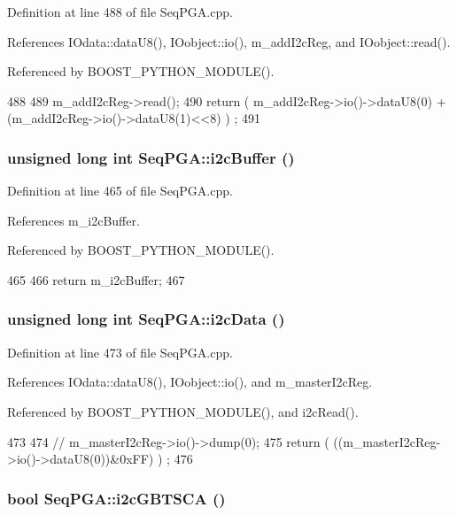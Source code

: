Definition at line 488 of file SeqPGA.cpp.

References IOdata::dataU8(), IOobject::io(), m\_\-addI2cReg, and IOobject::read().

Referenced by BOOST\_\-PYTHON\_\-MODULE().


\begin{DoxyCode}
488                                 {
489   m_addI2cReg->read();
490   return ( m_addI2cReg->io()->dataU8(0) + (m_addI2cReg->io()->dataU8(1)<<8) ) ;
491 }
\end{DoxyCode}
\hypertarget{classSeqPGA_a3d441522bfe5a6d35b8a77cbcd38b49e}{
\subsubsection[{i2cBuffer}]{\setlength{\rightskip}{0pt plus 5cm}unsigned long int SeqPGA::i2cBuffer ()}}
\label{classSeqPGA_a3d441522bfe5a6d35b8a77cbcd38b49e}


Definition at line 465 of file SeqPGA.cpp.

References m\_\-i2cBuffer.

Referenced by BOOST\_\-PYTHON\_\-MODULE().


\begin{DoxyCode}
465                                    {
466   return m_i2cBuffer;
467 }
\end{DoxyCode}
\hypertarget{classSeqPGA_a5e48f7b7ca1ada5a1decc0436dda4b26}{
\subsubsection[{i2cData}]{\setlength{\rightskip}{0pt plus 5cm}unsigned long int SeqPGA::i2cData ()}}
\label{classSeqPGA_a5e48f7b7ca1ada5a1decc0436dda4b26}


Definition at line 473 of file SeqPGA.cpp.

References IOdata::dataU8(), IOobject::io(), and m\_\-masterI2cReg.

Referenced by BOOST\_\-PYTHON\_\-MODULE(), and i2cRead().


\begin{DoxyCode}
473                                  {
474   //  m_masterI2cReg->io()->dump(0);
475   return ( ((m_masterI2cReg->io()->dataU8(0))&0xFF) ) ;
476 }
\end{DoxyCode}
\hypertarget{classSeqPGA_a1d9edf6e3303581efe0bdb1b8b3fff0c}{
\subsubsection[{i2cGBTSCA}]{\setlength{\rightskip}{0pt plus 5cm}bool SeqPGA::i2cGBTSCA ()}}
\label{classSeqPGA_a1d9edf6e3303581efe0bdb1b8b3fff0c}


